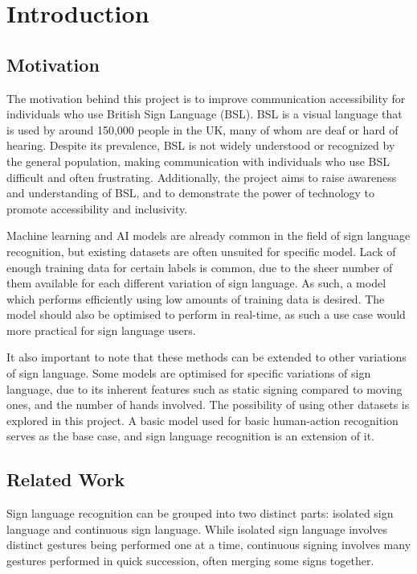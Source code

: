\documentclass[final,dissertation.tex]{subfiles}
\begin{document}
\chapter{Introduction}

\section{Motivation}

The motivation behind this project is to improve communication accessibility for individuals who use British Sign Language (BSL). BSL is a visual language that is used by around 150,000 people in the UK, many of whom are deaf or hard of hearing. Despite its prevalence, BSL is not widely understood or recognized by the general population, making communication with individuals who use BSL difficult and often frustrating. Additionally, the project aims to raise awareness and understanding of BSL, and to demonstrate the power of technology to promote accessibility and inclusivity.

Machine learning and AI models are already common in the field of sign language recognition, but existing datasets are often unsuited for specific model. Lack of enough training data for certain labels is common, due to the sheer number of them available for each different variation of sign language. As such, a model which performs efficiently using low amounts of training data is desired. The model should also be optimised to perform in real-time, as such a use case would more practical for sign language users.

It also important to note that these methods can be extended to other variations of sign language. Some models are optimised for specific variations of sign language, due to its inherent features such as static signing compared to moving ones, and the number of hands involved. The possibility of using other datasets is explored in this project. A basic model used for basic human-action recognition serves as the base case, and sign language recognition is an extension of it.

\section{Related Work}

Sign language recognition can be grouped into two distinct parts: isolated sign language and continuous sign language. While isolated sign language involves distinct gestures being performed one at a time, continuous signing involves many gestures performed in quick succession, often merging some signs together.
\end{document}
